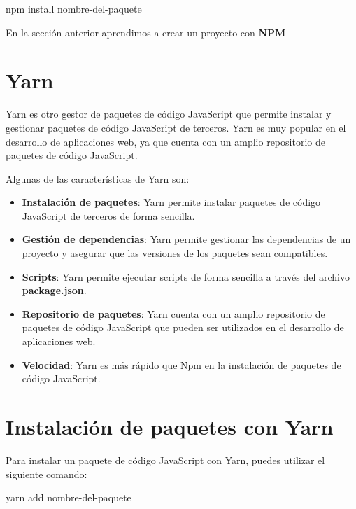 \documentclass[
  a4paper,
  DIV=11,
  numbers=noendperiod,
  onepage,
  openany]{scrreprt}
\newenvironment{Shaded}{\begin{snugshade}}{\end{snugshade}}
\newcommand{\ExtensionTok}[1]{\textcolor[rgb]{0.00,0.23,0.31}{#1}}
\newcommand{\NormalTok}[1]{\textcolor[rgb]{0.00,0.23,0.31}{#1}}
\begin{document}
\begin{Shaded}
\begin{Highlighting}[]
\ExtensionTok{npm}\NormalTok{ install nombre{-}del{-}paquete}
\end{Highlighting}
\end{Shaded}

En la sección anterior aprendimos a crear un proyecto con \textbf{NPM}

\section{Yarn}\label{yarn}

Yarn es otro gestor de paquetes de código JavaScript que permite
instalar y gestionar paquetes de código JavaScript de terceros. Yarn es
muy popular en el desarrollo de aplicaciones web, ya que cuenta con un
amplio repositorio de paquetes de código JavaScript.

Algunas de las características de Yarn son:

\begin{itemize}
\item
  \textbf{Instalación de paquetes}: Yarn permite instalar paquetes de
  código JavaScript de terceros de forma sencilla.
\item
  \textbf{Gestión de dependencias}: Yarn permite gestionar las
  dependencias de un proyecto y asegurar que las versiones de los
  paquetes sean compatibles.
\item
  \textbf{Scripts}: Yarn permite ejecutar scripts de forma sencilla a
  través del archivo \textbf{package.json}.
\item
  \textbf{Repositorio de paquetes}: Yarn cuenta con un amplio
  repositorio de paquetes de código JavaScript que pueden ser utilizados
  en el desarrollo de aplicaciones web.
\item
  \textbf{Velocidad}: Yarn es más rápido que Npm en la instalación de
  paquetes de código JavaScript.
\end{itemize}

\section{Instalación de paquetes con
Yarn}\label{instalaciuxf3n-de-paquetes-con-yarn}

Para instalar un paquete de código JavaScript con Yarn, puedes utilizar
el siguiente comando:

\begin{Shaded}
\begin{Highlighting}[]
\ExtensionTok{yarn}\NormalTok{ add nombre{-}del{-}paquete}
\end{Highlighting}
\end{Shaded}
\end{document}
